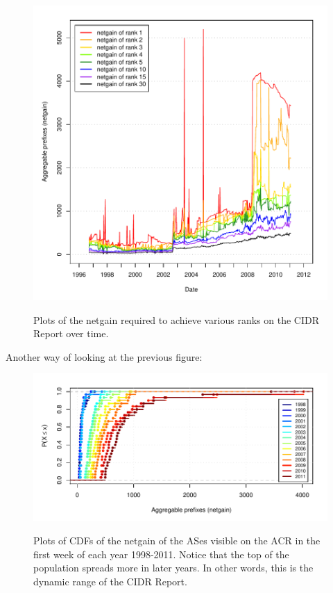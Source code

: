 \begin{figure}[H]
\begin{centering}
    \includegraphics[width=6in]{figures/acr_netgain_time.pdf}
    \vspace{-2em}\\
    \caption{Plots of the netgain required to achieve various ranks on the CIDR Report over time.}
\end{centering}
\end{figure}

Another way of looking at the previous figure:

\begin{figure}[H]
\begin{centering}
    \includegraphics[width=6in]{figures/netgain_cdf_acr.pdf}
    \vspace{-2em}\\
    \caption{Plots of CDFs of the netgain of the ASes visible on the ACR in the first week of each year 1998-2011. Notice that the top of the population spreads more in later years. In other words, this is the dynamic range of the CIDR Report. }
\end{centering}
\end{figure}

